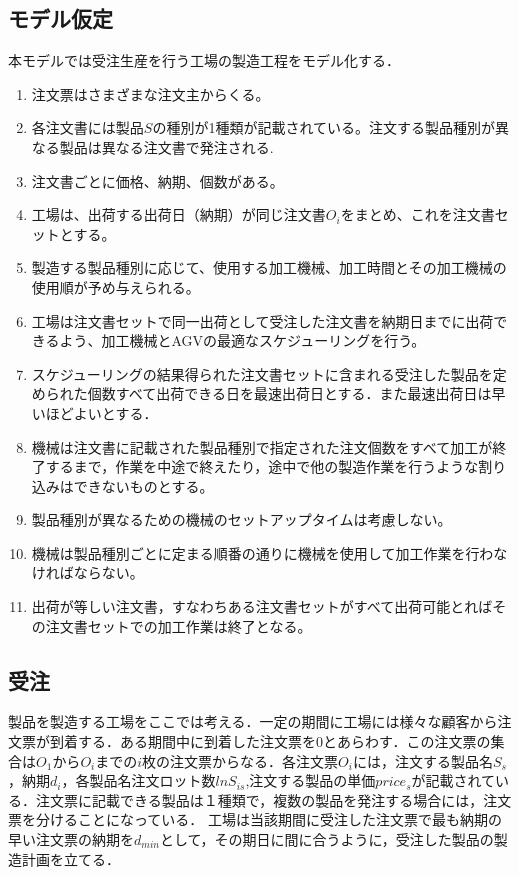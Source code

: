 \documentclass{jarticle}
\begin{document}
\subsection{モデル仮定}
本モデルでは受注生産を行う工場の製造工程をモデル化する．
\begin{enumerate}
    \item 注文票はさまざまな注文主からくる。
    \item 各注文書には製品$S$の種別が1種類が記載されている。注文する製品種別が異なる製品は異なる注文書で発注される.
    \item 注文書ごとに価格、納期、個数がある。
    \item 工場は、出荷する出荷日（納期）が同じ注文書$O_{\textit{i}}$をまとめ、これを注文書セットとする。
    \item 製造する製品種別に応じて、使用する加工機械、加工時間とその加工機械の使用順が予め与えられる。
    \item 工場は注文書セットで同一出荷として受注した注文書を納期日までに出荷できるよう、加工機械とAGVの最適なスケジューリングを行う。
    \item スケジューリングの結果得られた注文書セットに含まれる受注した製品を定められた個数すべて出荷できる日を最速出荷日とする．また最速出荷日は早いほどよいとする．
    \item 機械は注文書に記載された製品種別で指定された注文個数をすべて加工が終了するまで，作業を中途で終えたり，途中で他の製造作業を行うような割り込みはできないものとする。
    \item 製品種別が異なるための機械のセットアップタイムは考慮しない。
    \item 機械は製品種別ごとに定まる順番の通りに機械を使用して加工作業を行わなければならない。
    \item 出荷が等しい注文書，すなわちある注文書セットがすべて出荷可能とればその注文書セットでの加工作業は終了となる。
    \end{enumerate}

\subsection{受注}
製品を製造する工場をここでは考える．一定の期間に工場には様々な顧客から注文票が到着する．ある期間中に到着した注文票を$0$とあらわす．この注文票の集合は$O_1$から$O_i$までの$i$枚の注文票からなる．各注文票$O_i$には，注文する製品名$S_s$，納期$d_i$，各製品名注文ロット数$lnS_{is}$,注文する製品の単価$price_s$が記載されている．注文票に記載できる製品は１種類で，複数の製品を発注する場合には，注文票を分けることになっている．
工場は当該期間に受注した注文票で最も納期の早い注文票の納期を$d_{min}$として，その期日に間に合うように，受注した製品の製造計画を立てる．
\end{document}
